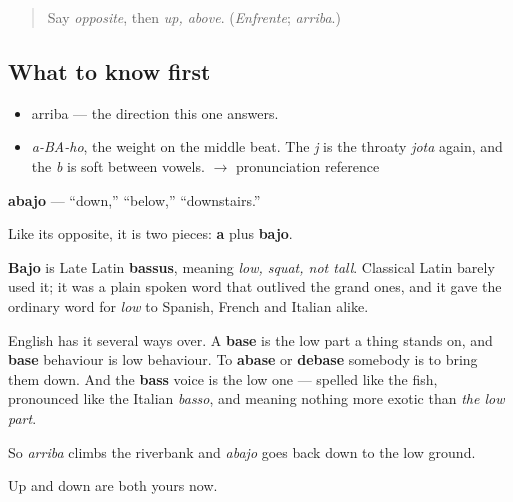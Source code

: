 \label{lesson:ES-C341-abajo}



\begin{quote}
Say \emph{opposite}, then \emph{up, above}. (\emph{Enfrente}; \emph{arriba}.)
\end{quote}

\subsection*{What to know first}
\begin{itemize}
\raggedright
  \item arriba — the direction this one answers.
\end{itemize}

\begin{sounds}
\begin{itemize}
\raggedright
  \item \emph{a-BA-ho}, the weight on the middle beat. The \emph{j} is the throaty \emph{jota} again, and the \emph{b} is soft between vowels. $\to$ pronunciation reference
\end{itemize}
\end{sounds}

\begin{cousinweb}
\textbf{abajo} — \textquotedblleft{}down,\textquotedblright{} \textquotedblleft{}below,\textquotedblright{} \textquotedblleft{}downstairs.\textquotedblright{}

Like its opposite, it is two pieces: \textbf{a} plus \textbf{bajo}.

\textbf{Bajo} is Late Latin \textbf{bassus}, meaning \emph{low, squat, not tall}. Classical Latin barely used it; it was a plain spoken word that outlived the grand ones, and it gave the ordinary word for \emph{low} to Spanish, French and Italian alike.

English has it several ways over. A \textbf{base} is the low part a thing stands on, and \textbf{base} behaviour is low behaviour. To \textbf{abase} or \textbf{debase} somebody is to bring them down. And the \textbf{bass} voice is the low one — spelled like the fish, pronounced like the Italian \emph{basso}, and meaning nothing more exotic than \emph{the low part}.

So \emph{arriba} climbs the riverbank and \emph{abajo} goes back down to the low ground.
\end{cousinweb}

\begin{grammarlens}[title={What you've built}]
Up and down are both yours now.
\end{grammarlens}


